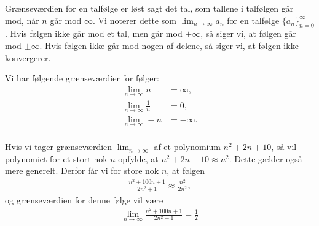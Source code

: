 Grænseværdien for en talfølge er løst sagt det tal, som tallene i talfølgen går mod, når $n$ går mod $\infty$. Vi noterer dette som $\lim_{n\to \infty} a_n$ for en talfølge $\{a_n\}_{n=0}^{\infty}$. Hvis følgen ikke går mod et tal, men går mod $\pm\infty$, så siger vi, at følgen går mod $\pm\infty$. Hvis følgen ikke går mod nogen af delene, så siger vi, at følgen ikke konvergerer. 
\begin{exa}
Vi har følgende grænseværdier for følger:
\begin{align*}
\lim_{n \to \infty} n  &= \infty,\\
\lim_{n\to \infty} \frac{1}{n} &= 0,\\
\lim_{n\to \infty} -n &= -\infty.\\
\end{align*}
\end{exa}
\begin{exa}
Hvis vi tager grænseværdien $\lim_{n\to \infty}$ af et polynomium $n^2+2n+10$, så vil polynomiet for et stort nok $n$ opfylde, at $n^2 + 2n+10 \approx n^2$. Dette gælder også mere generelt. Derfor får vi for store nok $n$, at følgen
\begin{align*}
\frac{n^2+100n+1}{2n^2+1} \approx \frac{n^2}{2n^2}, 
\end{align*} 
og grænseværdien for denne følge vil være
\begin{align*}
\lim_{n\to \infty}\frac{n^2+100n+1}{2n^2+1} = \frac{1}{2}
\end{align*}
\end{exa}

